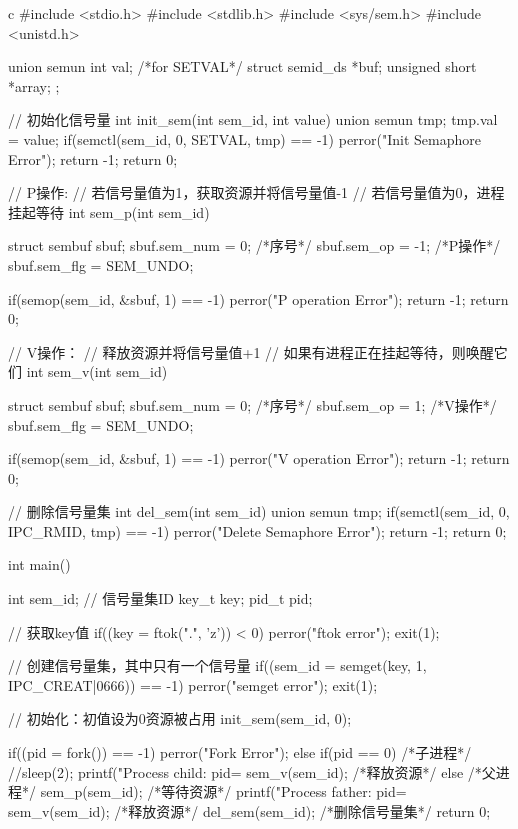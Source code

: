 \begin{code-block}{c}
#include <stdio.h>
#include <stdlib.h>
#include <sys/sem.h>
#include <unistd.h>

union semun
{
        int              val; /*for SETVAL*/
        struct semid_ds *buf;
        unsigned short  *array;
};

// 初始化信号量
int init_sem(int sem_id, int value)
{
        union semun tmp;
        tmp.val = value;
        if(semctl(sem_id, 0, SETVAL, tmp) == -1)
        {
                perror("Init Semaphore Error");
                return -1;
        }
        return 0;
}

// P操作:
//    若信号量值为1，获取资源并将信号量值-1
//    若信号量值为0，进程挂起等待
int sem_p(int sem_id)
{
        struct sembuf sbuf;
        sbuf.sem_num = 0; /*序号*/
        sbuf.sem_op = -1; /*P操作*/
        sbuf.sem_flg = SEM_UNDO;

        if(semop(sem_id, &sbuf, 1) == -1)
        {
                perror("P operation Error");
                return -1;
        }
        return 0;
}

// V操作：
//    释放资源并将信号量值+1
//    如果有进程正在挂起等待，则唤醒它们
int sem_v(int sem_id)
{
        struct sembuf sbuf;
        sbuf.sem_num = 0; /*序号*/
        sbuf.sem_op = 1;  /*V操作*/
        sbuf.sem_flg = SEM_UNDO;

        if(semop(sem_id, &sbuf, 1) == -1)
        {
                perror("V operation Error");
                return -1;
        }
        return 0;
}

// 删除信号量集
int del_sem(int sem_id)
{
        union semun tmp;
        if(semctl(sem_id, 0, IPC_RMID, tmp) == -1)
        {
                perror("Delete Semaphore Error");
                return -1;
        }
        return 0;
}


int main()
{
        int sem_id;  // 信号量集ID
        key_t key;
        pid_t pid;

        // 获取key值
        if((key = ftok(".", 'z')) < 0)
        {
                perror("ftok error");
                exit(1);
        }

        // 创建信号量集，其中只有一个信号量
        if((sem_id = semget(key, 1, IPC_CREAT|0666)) == -1)
        {
                perror("semget error");
                exit(1);
        }

        // 初始化：初值设为0资源被占用
        init_sem(sem_id, 0);

        if((pid = fork()) == -1)
                perror("Fork Error");
        else if(pid == 0) /*子进程*/
        {
                //sleep(2);
                printf("Process child: pid=%
                sem_v(sem_id);  /*释放资源*/
        }
        else  /*父进程*/
        {
                sem_p(sem_id);   /*等待资源*/
                printf("Process father: pid=%
                sem_v(sem_id);   /*释放资源*/
                del_sem(sem_id); /*删除信号量集*/
        }
        return 0;
}
\end{code-block}


